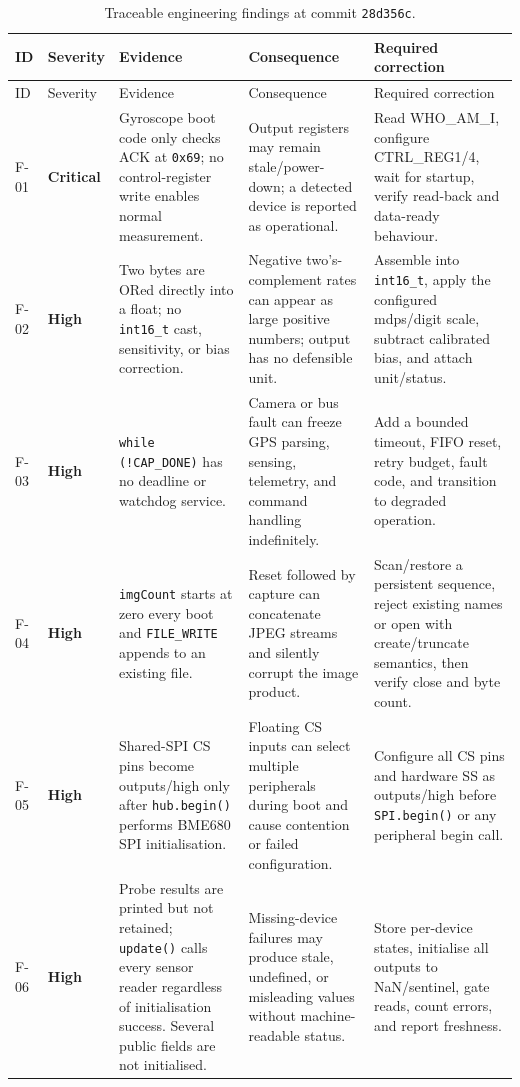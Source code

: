 \documentclass[11pt,a4paper]{article}
\newcommand{\code}[1]{\texttt{#1}}
\newcommand{\status}[2]{\textcolor{#1}{\textbf{#2}}}
\newcommand{\critical}{\status{redx}{Critical}}
\newcommand{\high}{\status{amber}{High}}
\begin{document}
\begin{longtable}{P{0.07\textwidth}P{0.10\textwidth}P{0.21\textwidth}P{0.24\textwidth}P{0.25\textwidth}}
\caption{Traceable engineering findings at commit \code{28d356c}.}\label{tab:findings}\\
\toprule
ID & Severity & Evidence & Consequence & Required correction\\
\midrule
\endfirsthead
\toprule
ID & Severity & Evidence & Consequence & Required correction\\
\midrule
\endhead
F-01 & \critical & Gyroscope boot code only checks ACK at \code{0x69}; no control-register write enables normal measurement. & Output registers may remain stale/power-down; a detected device is reported as operational. & Read WHO\_AM\_I, configure CTRL\_REG1/4, wait for startup, verify read-back and data-ready behaviour.\\
F-02 & \high & Two bytes are ORed directly into a float; no \code{int16\_t} cast, sensitivity, or bias correction. & Negative two's-complement rates can appear as large positive numbers; output has no defensible unit. & Assemble into \code{int16\_t}, apply the configured mdps/digit scale, subtract calibrated bias, and attach unit/status.\\
F-03 & \high & \code{while (!CAP\_DONE)} has no deadline or watchdog service. & Camera or bus fault can freeze GPS parsing, sensing, telemetry, and command handling indefinitely. & Add a bounded timeout, FIFO reset, retry budget, fault code, and transition to degraded operation.\\
F-04 & \high & \code{imgCount} starts at zero every boot and \code{FILE\_WRITE} appends to an existing file. & Reset followed by capture can concatenate JPEG streams and silently corrupt the image product. & Scan/restore a persistent sequence, reject existing names or open with create/truncate semantics, then verify close and byte count.\\
F-05 & \high & Shared-SPI CS pins become outputs/high only after \code{hub.begin()} performs BME680 SPI initialisation. & Floating CS inputs can select multiple peripherals during boot and cause contention or failed configuration. & Configure all CS pins and hardware SS as outputs/high before \code{SPI.begin()} or any peripheral begin call.\\
F-06 & \high & Probe results are printed but not retained; \code{update()} calls every sensor reader regardless of initialisation success. Several public fields are not initialised. & Missing-device failures may produce stale, undefined, or misleading values without machine-readable status. & Store per-device states, initialise all outputs to NaN/sentinel, gate reads, count errors, and report freshness.\\

\end{longtable}
\end{document}

